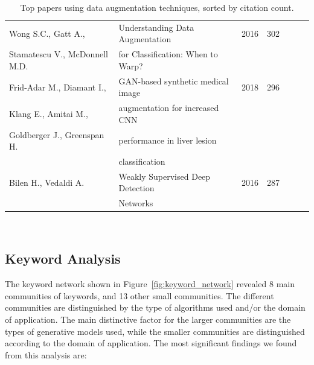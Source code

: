\begin{table}[ht]
\begin{center}
\begin{tabular*}{\textwidth}{@{\extracolsep{\fill}}lllllll@{\extracolsep{\fill}}}
        Wong S.C., Gatt A., & Understanding Data Augmentation & 2016 & 302 \\
        \vspace{.2cm}Stamatescu V., McDonnell M.D. & for Classification: When to Warp? && \\

        Frid-Adar M., Diamant I., & GAN-based synthetic medical image & 2018 & 296 \\
        Klang E., Amitai M., & augmentation for increased CNN && \\
        Goldberger J., Greenspan H. & performance in liver lesion && \\
        \vspace{.2cm}               & classification \\

        Bilen H., Vedaldi A. & Weakly Supervised Deep Detection & 2016 & 287 \\
        \vspace{.2cm}        & Networks \\

        \bottomrule
    \end{tabular*}
    \caption[Top papers using data augmentation techniques.]{%
        Top papers using data augmentation techniques, sorted by citation
        count.
    }~\label{tab:top_papers}
    \end{center}
\end{table}

\subsection{Keyword Analysis}

The keyword network shown in Figure~\ref{fig:keyword_network} revealed 8 main
communities of keywords, and 13 other small communities. The different
communities are distinguished by the type of algorithms used and/or the domain
of application. The main distinctive factor for the larger communities are the
types of generative models used, while the smaller communities are
distinguished according to the domain of application. The most significant
findings we found from this analysis are:

